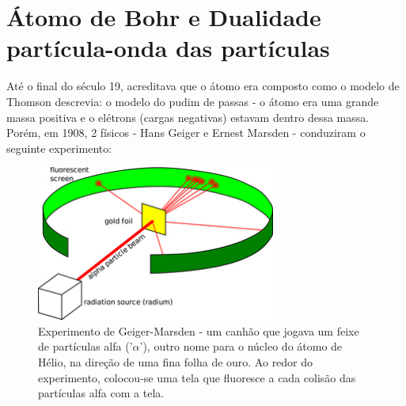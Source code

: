 \documentclass[12pt]{extarticle}
\newcommand{\<}{\langle}
\renewcommand{\>}{\rangle}
\theoremstyle{definition}
\begin{document}
\section{Átomo de Bohr e Dualidade partícula-onda das partículas}
Até o final do século 19, acreditava que o átomo era composto como o modelo de Thomson descrevia: o modelo do pudim de passas - o átomo era uma grande massa positiva e o elétrons (cargas negativas) estavam dentro dessa massa. Porém, em 1908, 2 físicos - Hans Geiger e Ernest Marsden - conduziram o seguinte experimento:
\begin{figure}[H]
    \centering
    \includegraphics[width=0.7\textwidth]{marsden-geiger.jpg}
    \caption{Experimento de Geiger-Marsden - um canhão que jogava um feixe de partículas alfa ('$\alpha$'), outro nome para o núcleo do átomo de Hélio, na direção de uma fina folha de ouro. Ao redor do experimento, colocou-se uma tela que fluoresce a cada colisão das partículas alfa com a tela.}
    \label{fig:geiger-marsden}
\end{figure}
\end{document}
